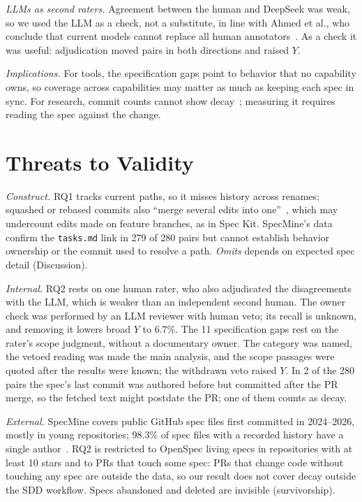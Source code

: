 \documentclass[10pt,conference]{IEEEtran}
\begin{document}
\emph{LLMs as second raters.} Agreement between the human and DeepSeek was weak, so we used the LLM as a check, not a substitute, in line with Ahmed et al., who conclude that current models cannot replace all human annotators~\cite{ahmed2025llm}. As a check it was useful: adjudication moved pairs in both directions and raised $Y$.

\emph{Implications.} For tools, the specification gaps point to behavior that no capability owns, so coverage across capabilities may matter as much as keeping each spec in sync. For research, commit counts cannot show decay~\cite{agarwal2026sdd}; measuring it requires reading the spec against the change.

\section{Threats to Validity}\label{sec:threats}
\emph{Construct.} RQ1 tracks current paths, so it misses history across renames; squashed or rebased commits also ``merge several edits into one''~\cite{agarwal2026sdd}, which may undercount edits made on feature branches, as in Spec Kit. SpecMine's data confirm the \texttt{tasks.md} link in 279 of 280 pairs but cannot establish behavior ownership or the commit used to resolve a path. \emph{Omits} depends on expected spec detail (Discussion).

\emph{Internal.} RQ2 rests on one human rater, who also adjudicated the disagreements with the LLM, which is weaker than an independent second human. The owner check was performed by an LLM reviewer with human veto; its recall is unknown, and removing it lowers broad $Y$ to 6.7\%. The 11 specification gaps rest on the rater's scope judgment, without a documentary owner. The category was named, the vetoed reading was made the main analysis, and the scope passages were quoted after the results were known; the withdrawn veto raised $Y$. In 2 of the 280 pairs the spec's last commit was authored before but committed after the PR merge, so the fetched text might postdate the PR; one of them counts as decay.

\emph{External.} SpecMine covers public GitHub spec files first committed in 2024--2026, mostly in young repositories; 98.3\% of spec files with a recorded history have a single author~\cite{agarwal2026sdd}. RQ2 is restricted to OpenSpec living specs in repositories with at least 10 stars and to PRs that touch some spec: PRs that change code without touching any spec are outside the data, so our result does not cover decay outside the SDD workflow. Specs abandoned and deleted are invisible (survivorship).
\end{document}

